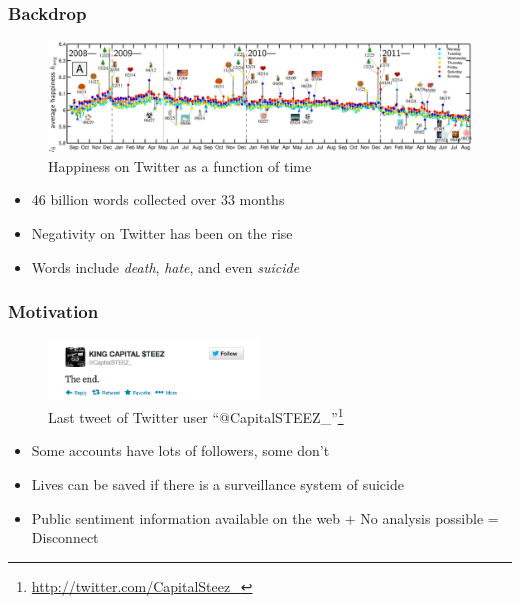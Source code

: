 \documentclass{beamer}
\begin{document}
    \begin{frame}
        \frametitle{Backdrop}
        \begin{figure}
            \centering
            \includegraphics[width=\textwidth]{figures/twitter_happiness.png}
            \caption{Happiness on Twitter as a function of time}
        \end{figure}
        \begin{itemize}
            \item{46 billion words collected over 33 months}
            \item{Negativity on Twitter has been on the rise}
            \item{Words include \emph{death}, \emph{hate}, and even \emph{suicide}}
        \end{itemize}
    \end{frame}
    
    \begin{frame}
        \frametitle{Motivation}
        \begin{figure}
            \centering
            \includegraphics[width=0.5\textwidth]{figures/twitter_kcs.png}
            \caption{Last tweet of Twitter user ``@CapitalSTEEZ\_''\footnote{\url{http://twitter.com/CapitalSteez\_}}}
        \end{figure}
        \begin{itemize}
            \item{Some accounts have lots of followers, some don't}
            \item{Lives can be saved if there is a surveillance system of suicide}
            \item{Public sentiment information available on the web + No analysis possible = Disconnect}
        \end{itemize}
    \end{frame}
    
\end{document}
